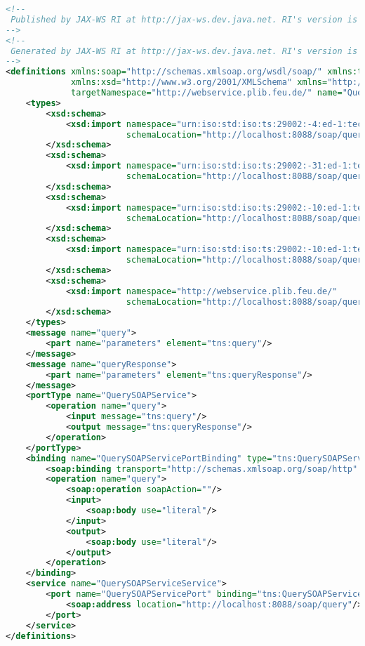  \begin{lstlisting}[caption=WSDL des Query Services mit SOAP, language=XML, label=lst:wsdl_query_service] 
 <!--
 Published by JAX-WS RI at http://jax-ws.dev.java.net. RI's version is JAX-WS RI 2.1.6 in JDK 6.
-->
<!--
 Generated by JAX-WS RI at http://jax-ws.dev.java.net. RI's version is JAX-WS RI 2.1.6 in JDK 6.
-->
<definitions xmlns:soap="http://schemas.xmlsoap.org/wsdl/soap/" xmlns:tns="http://webservice.plib.feu.de/"
             xmlns:xsd="http://www.w3.org/2001/XMLSchema" xmlns="http://schemas.xmlsoap.org/wsdl/"
             targetNamespace="http://webservice.plib.feu.de/" name="QuerySOAPServiceService">
    <types>
        <xsd:schema>
            <xsd:import namespace="urn:iso:std:iso:ts:29002:-4:ed-1:tech:xml-schema:basic"
                        schemaLocation="http://localhost:8088/soap/query?xsd=1"/>
        </xsd:schema>
        <xsd:schema>
            <xsd:import namespace="urn:iso:std:iso:ts:29002:-31:ed-1:tech:xml-schema:query"
                        schemaLocation="http://localhost:8088/soap/query?xsd=2"/>
        </xsd:schema>
        <xsd:schema>
            <xsd:import namespace="urn:iso:std:iso:ts:29002:-10:ed-1:tech:xml-schema:value"
                        schemaLocation="http://localhost:8088/soap/query?xsd=3"/>
        </xsd:schema>
        <xsd:schema>
            <xsd:import namespace="urn:iso:std:iso:ts:29002:-10:ed-1:tech:xml-schema:catalogue"
                        schemaLocation="http://localhost:8088/soap/query?xsd=4"/>
        </xsd:schema>
        <xsd:schema>
            <xsd:import namespace="http://webservice.plib.feu.de/"
                        schemaLocation="http://localhost:8088/soap/query?xsd=5"/>
        </xsd:schema>
    </types>
    <message name="query">
        <part name="parameters" element="tns:query"/>
    </message>
    <message name="queryResponse">
        <part name="parameters" element="tns:queryResponse"/>
    </message>
    <portType name="QuerySOAPService">
        <operation name="query">
            <input message="tns:query"/>
            <output message="tns:queryResponse"/>
        </operation>
    </portType>
    <binding name="QuerySOAPServicePortBinding" type="tns:QuerySOAPService">
        <soap:binding transport="http://schemas.xmlsoap.org/soap/http" style="document"/>
        <operation name="query">
            <soap:operation soapAction=""/>
            <input>
                <soap:body use="literal"/>
            </input>
            <output>
                <soap:body use="literal"/>
            </output>
        </operation>
    </binding>
    <service name="QuerySOAPServiceService">
        <port name="QuerySOAPServicePort" binding="tns:QuerySOAPServicePortBinding">
            <soap:address location="http://localhost:8088/soap/query"/>
        </port>
    </service>
</definitions>
  \end{lstlisting} 
 
